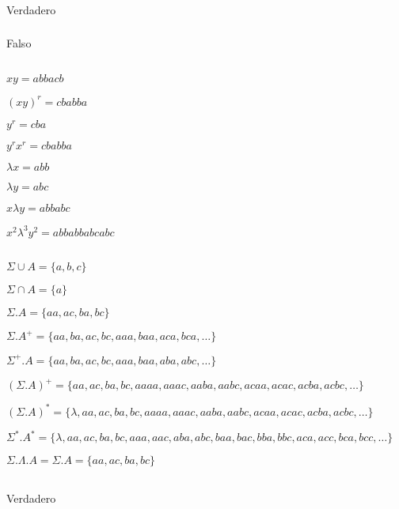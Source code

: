 \subsubsection{}
Verdadero

\subsubsection{}
Falso

\subsection{}
$xy = abbacb$

$(xy)^r = cbabba$

$y^r = cba$

$y^rx^r = cbabba$

$\lambda x = abb$

$\lambda y = abc$

$x \lambda y = abbabc$

$x^2 \lambda^3 y^2 = abbabbabcabc$

\subsection{}
$\Sigma \cup A = \{a,b,c\}$

$\Sigma \cap A = \{a\}$

$\Sigma . A = \{aa, ac, ba, bc\}$

$\Sigma . A^+ = \{aa, ba, ac, bc, aaa, baa, aca, bca, \ldots\}$

$\Sigma^+ . A = \{aa, ba, ac, bc, aaa, baa, aba, abc, \ldots\}$

$(\Sigma . A)^+ = \{aa, ac, ba, bc, aaaa, aaac, aaba, aabc, acaa, acac, acba, acbc, \ldots\}$

$(\Sigma . A)^* = \{\lambda, aa, ac, ba, bc, aaaa, aaac, aaba, aabc, acaa, acac, acba, acbc, \ldots\}$

$\Sigma^* . A^* = \{\lambda, aa, ac, ba, bc, aaa, aac, aba, abc, baa, bac, bba, bbc, aca, acc, bca, bcc, \ldots\}$

$\Sigma . \Lambda . A = \Sigma . A = \{aa, ac, ba, bc\}$

\subsection{}
\subsubsection{}
Verdadero

